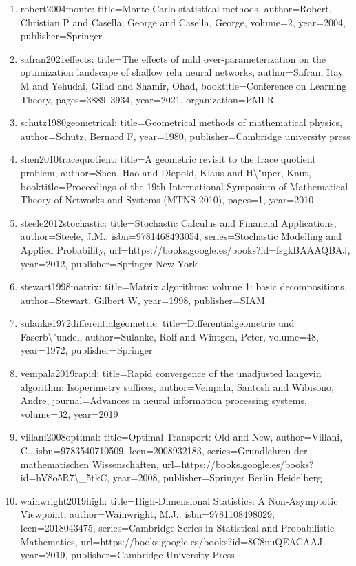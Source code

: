 \documentclass[11pt]{article}
\begin{document}
\begin{enumerate}[leftmargin=*]
  \item robert2004monte: title=Monte Carlo statistical methods, author=Robert, Christian P and Casella, George and Casella, George, volume=2, year=2004, publisher=Springer
  \item safran2021effects: title=The effects of mild over-parameterization on the optimization landscape of shallow relu neural networks, author=Safran, Itay M and Yehudai, Gilad and Shamir, Ohad, booktitle=Conference on Learning Theory, pages=3889--3934, year=2021, organization=PMLR
  \item schutz1980geometrical: title=Geometrical methods of mathematical physics, author=Schutz, Bernard F, year=1980, publisher=Cambridge university press
  \item shen2010tracequotient: title=A geometric revisit to the trace quotient problem, author=Shen, Hao and Diepold, Klaus and H\textbackslash{}"uper, Knut, booktitle=Proceedings of the 19th International Symposium of Mathematical Theory of Networks and Systems (MTNS 2010), pages=1, year=2010
  \item steele2012stochastic: title=Stochastic Calculus and Financial Applications, author=Steele, J.M., isbn=9781468493054, series=Stochastic Modelling and Applied Probability, url=https://books.google.es/books?id=fsgkBAAAQBAJ, year=2012, publisher=Springer New York
  \item stewart1998matrix: title=Matrix algorithms: volume 1: basic decompositions, author=Stewart, Gilbert W, year=1998, publisher=SIAM
  \item sulanke1972differentialgeometrie: title=Differentialgeometrie und Faserb\textbackslash{}"undel, author=Sulanke, Rolf and Wintgen, Peter, volume=48, year=1972, publisher=Springer
  \item vempala2019rapid: title=Rapid convergence of the unadjusted langevin algorithm: Isoperimetry suffices, author=Vempala, Santosh and Wibisono, Andre, journal=Advances in neural information processing systems, volume=32, year=2019
  \item villani2008optimal: title=Optimal Transport: Old and New, author=Villani, C., isbn=9783540710509, lccn=2008932183, series=Grundlehren der mathematischen Wissenschaften, url=https://books.google.es/books?id=hV8o5R7\textbackslash{}\_5tkC, year=2008, publisher=Springer Berlin Heidelberg
  \item wainwright2019high: title=High-Dimensional Statistics: A Non-Asymptotic Viewpoint, author=Wainwright, M.J., isbn=9781108498029, lccn=2018043475, series=Cambridge Series in Statistical and Probabilistic Mathematics, url=https://books.google.es/books?id=8C8nuQEACAAJ, year=2019, publisher=Cambridge University Press

\end{enumerate}
\end{document}
